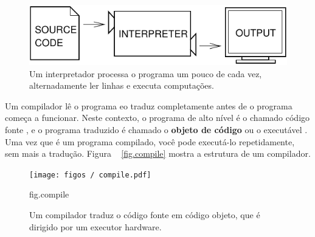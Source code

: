\documentclass[10pt]{book}
\begin{document}
\begin{figure}
\centerline
{\includegraphics[scale=0.9]{figs/interpret.pdf}}
\caption{Um interpretador processa o programa um pouco de cada vez,
alternadamente ler linhas e executa computações.}
\label{fig.interpret}
\end{figure}

Um compilador lê o programa eo traduz completamente antes de o
programa começa a funcionar. Neste contexto, o programa de alto nível é
o chamado código fonte {\bf}, e o programa traduzido é chamado o
{\bf objeto de código} ou {o executável \bf}. Uma vez que é um programa
compilado, você pode executá-lo repetidamente, sem mais a tradução.
Figura ~ \ref {fig.compile} mostra a estrutura de um compilador.

\begin{figure}
\centerline
{\texttt{[image: figos / compile.pdf]}}
\caption{Um compilador traduz o código fonte em código objeto, que é
dirigido por um executor hardware.}
\label{} fig.compile
\end{figure}
\end{document}
